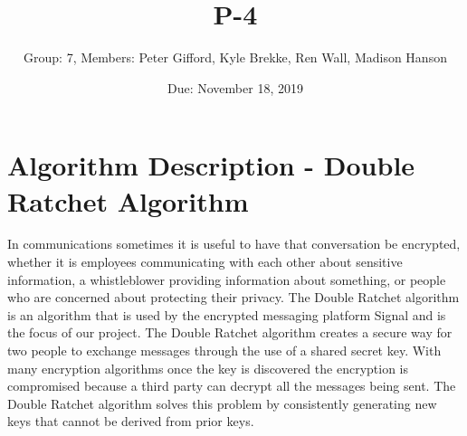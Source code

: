 \documentclass{article}
\title{P-4}
\author{Group: 7, Members: Peter Gifford, Kyle Brekke, Ren Wall, Madison Hanson}
\date{Due: November 18, 2019}
\begin{document}
\maketitle

\section{Algorithm Description - Double Ratchet Algorithm}

In communications sometimes it is useful to have that conversation be encrypted, whether it is employees communicating with each other about sensitive information, a whistleblower providing information about something, or people who are concerned about protecting their privacy. The Double Ratchet algorithm is an algorithm that is used by the encrypted messaging platform Signal and is the focus of our project. The Double Ratchet algorithm creates a secure way for two people to exchange messages through the use of a shared secret key. With many encryption algorithms once the key is discovered the encryption is compromised because a third party can decrypt all the messages being sent. The Double Ratchet algorithm solves this problem by consistently generating new keys that cannot be derived from prior keys. \newline
\end{document}
